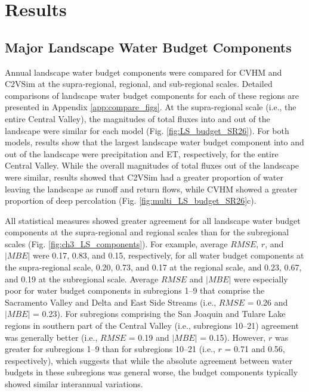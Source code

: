 \section{Results}
\subsection{Major Landscape Water Budget Components}

Annual landscape water budget components were compared for CVHM and C2VSim at the supra-regional, regional, and sub-regional scales. Detailed comparisons of landscape water budget components for each of these regions are presented in Appendix \ref{app:compare_figs}. At the supra-regional scale (i.e., the entire Central Valley), the magnitudes of total fluxes into and out of the landscape were similar for each model (Fig. \ref{fig:LS_budget_SR26}). For both models, results show that the largest landscape water budget component into and out of the landscape were precipitation and ET, respectively, for the entire Central Valley. While the overall magnitudes of total fluxes out of the landscape were similar, results showed that C2VSim had a greater proportion of water leaving the landscape as runoff and return flows, while CVHM showed a greater proportion of deep percolation (Fig. \ref{fig:multi_LS_budget_SR26}c).

All statistical measures showed greater agreement for all landscape water budget components at the supra-regional and regional scales than for the subregional scales (Fig. \ref{fig:ch3_LS_components}). For example, average $RMSE$, $r$, and $|MBE|$ were 0.17, 0.83, and 0.15, respectively, for all water budget components at the supra-regional scale, 0.20, 0.73, and 0.17 at the regional scale, and 0.23, 0.67, and 0.19 at the subregional scale. Average $RMSE$ and $|MBE|$ were especially poor for water budget components in subregions 1--9 that comprise the Sacramento Valley and Delta and East Side Streams (i.e., $RMSE$ = 0.26 and $|MBE|$ = 0.23). For subregions comprising the San Joaquin and Tulare Lake regions in southern part of the Central Valley  (i.e., subregions 10--21) agreement was generally better (i.e., $RMSE$ = 0.19 and $|MBE|$ = 0.15). However, $r$ was greater for subregions 1--9 than for subregions 10--21 (i.e., $r$ = 0.71 and 0.56, respectively), which suggests that while the absolute agreement between water budgets in these subregions was general worse, the budget components typically showed similar interannual variations.

